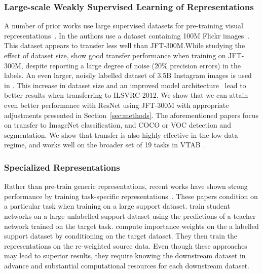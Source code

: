 \documentclass[runningheads]{llncs}
\newcommand{\imagenet}{{ILSVRC-2012}}
\begin{document}
\subsubsection{Large-scale Weakly Supervised Learning of Representations}
A number of prior works  use large supervised datasets for pre-training visual representations~\cite{joulin2016learning,sun2017revisiting,li2017learning,mahajan2018exploring}.
In \cite{joulin2016learning,li2017learning} the authors use a dataset containing 100M Flickr images~\cite{thomee2015yfcc100m}.
This dataset appears to transfer less well than JFT-300M.While studying the effect of dataset size, \cite{sun2017revisiting} show good transfer performance when training on JFT-300M, despite reporting a large degree of noise (20\% precision errors) in the labels.
An even larger, noisily labelled dataset of 3.5B Instagram images is used in \cite{mahajan2018exploring}.
This increase in dataset size and an improved model architecture~\cite{xie2017aggregated} lead to better results when transferring to \imagenet{}.
We show that we can attain even better performance with ResNet using JFT-300M with appropriate adjustments presented in Section~\ref{sec:methods}.
The aforementioned papers focus on transfer to ImageNet classification, and COCO or VOC detection and segmentation.
We show that transfer is also highly effective in the low data regime, and works well on the broader set of 19 tasks in VTAB~\cite{zhai2019visual}.

\vspace{-2mm}

\subsubsection{Specialized Representations}
Rather than pre-train generic representations, recent works have shown strong performance by training task-specific representations~\cite{yalniz2019billion,dat,noisystudent}.
These papers condition on a particular task when training on a large support dataset.
\cite{yalniz2019billion,noisystudent} train student networks on a large unlabelled support dataset using the predictions of a teacher network trained on the target task.
\cite{dat} compute importance weights on the a labelled support dataset by conditioning on the target dataset.
They then train the representations on the re-weighted source data.
Even though these approaches may lead to superior results, they require knowing the downstream dataset in advance and substantial computational resources for each downstream dataset.
\end{document}
